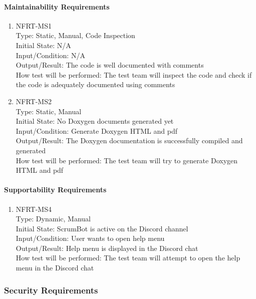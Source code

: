 \documentclass[12pt, titlepage]{article}
\begin{document}
\paragraph{Maintainability Requirements}
\begin{enumerate}

\item{NFRT-MS1}\\
Type: Static, Manual, Code Inspection\\
Initial State: N/A\\
Input/Condition: N/A\\
Output/Result: The code is well documented with comments\\
How test will be performed: The test team will inspect the code and check if the code is adequately documented using comments
\item{NFRT-MS2}\\
Type: Static, Manual\\
Initial State: No Doxygen documents generated yet\\
Input/Condition: Generate Doxygen HTML and pdf\\
Output/Result: The Doxygen documentation is successfully compiled and generated\\
How test will be performed: The test team will try to generate Doxygen HTML and pdf
\end{enumerate}

\paragraph{Supportability Requirements}
\begin{enumerate}

\item{NFRT-MS4}\\
Type: Dynamic, Manual\\
Initial State: ScrumBot is active on the Discord channel\\
Input/Condition: User wants to open help menu\\
Output/Result: Help menu is displayed in the Discord chat\\
How test will be performed: The test team will attempt to open the help menu in the Discord chat
\end{enumerate}

\subsubsection{Security Requirements}
\end{document}

